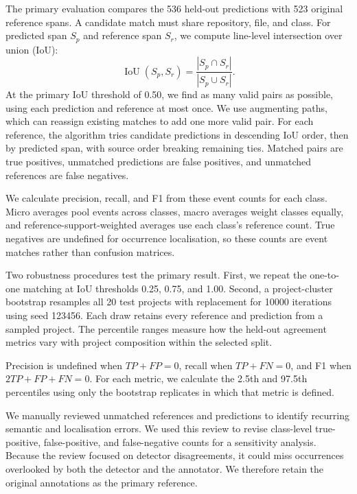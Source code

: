 The primary evaluation compares the \num{536} held-out predictions with \num{523} original reference spans. A candidate match must share repository, file, and class. For predicted span $S_p$ and reference span $S_r$, we compute line-level intersection over union (IoU):
\begin{equation}
    \operatorname{IoU}(S_p,S_r)=\frac{|S_p\cap S_r|}{|S_p\cup S_r|}.
\end{equation}
At the primary IoU threshold of \num{0.50}, we find as many valid pairs as possible, using each prediction and reference at most once. We use augmenting paths, which can reassign existing matches to add one more valid pair. For each reference, the algorithm tries candidate predictions in descending IoU order, then by predicted span, with source order breaking remaining ties. Matched pairs are true positives, unmatched predictions are false positives, and unmatched references are false negatives.

We calculate precision, recall, and F1 from these event counts for each class. Micro averages pool events across classes, macro averages weight classes equally, and reference-support-weighted averages use each class's reference count. True negatives are undefined for occurrence localisation, so these counts are event matches rather than confusion matrices.

Two robustness procedures test the primary result. First, we repeat the one-to-one matching at IoU thresholds \num{0.25}, \num{0.75}, and \num{1.00}. Second, a project-cluster bootstrap resamples all \num{20} test projects with replacement for \num{10000} iterations using seed \num{123456}. Each draw retains every reference and prediction from a sampled project. The percentile ranges measure how the held-out agreement metrics vary with project composition within the selected split.

Precision is undefined when $TP+FP=0$, recall when $TP+FN=0$, and F1 when $2TP+FP+FN=0$. For each metric, we calculate the 2.5th and 97.5th percentiles using only the bootstrap replicates in which that metric is defined.

We manually reviewed unmatched references and predictions to identify recurring semantic and localisation errors. We used this review to revise class-level true-positive, false-positive, and false-negative counts for a sensitivity analysis. Because the review focused on detector disagreements, it could miss occurrences overlooked by both the detector and the annotator. We therefore retain the original annotations as the primary reference.

